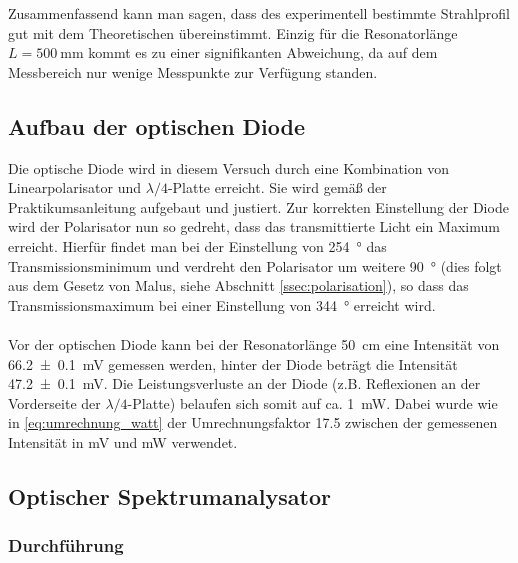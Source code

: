 \documentclass[11pt, a4paper]{article}
\numberwithin{equation}{section}
\begin{document}
Zusammenfassend kann man sagen, dass des experimentell bestimmte Strahlprofil gut mit dem Theoretischen übereinstimmt.
Einzig für die Resonatorlänge $L = \SI{500}{\milli\metre}$ kommt es zu einer signifikanten Abweichung, da auf dem Messbereich nur wenige Messpunkte zur Verfügung standen.


\subsection{Aufbau der optischen Diode}

Die optische Diode wird in diesem Versuch durch eine Kombination von Linearpolarisator und $\lambda/4$-Platte erreicht.
Sie wird gemäß der Praktikumsanleitung aufgebaut und justiert.
Zur korrekten Einstellung der Diode wird der Polarisator nun so gedreht, dass das transmittierte Licht ein Maximum erreicht.
Hierfür findet man bei der Einstellung von \SI{254}{\degree} das Transmissionsminimum und verdreht den Polarisator um weitere \SI{90}{\degree} (dies folgt aus dem Gesetz von Malus, siehe Abschnitt \ref{ssec:polarisation}), so dass das Transmissionsmaximum bei einer Einstellung von \SI{344}{\degree} erreicht wird.\\
\\
Vor der optischen Diode kann bei der Resonatorlänge \SI{50}{\centi\metre} eine Intensität von \SI{66.2+-0.1}{\milli\volt} gemessen werden, hinter der Diode beträgt die Intensität \SI{47.2+-0.1}{\milli\volt}.
Die Leistungsverluste an der Diode (z.B. Reflexionen an der Vorderseite der $\lambda/4$-Platte) belaufen sich somit auf ca. \SI{1}{\milli\watt}.
Dabei wurde wie in \eqref{eq:umrechnung_watt} der Umrechnungsfaktor \num{17.5} zwischen der gemessenen Intensität in \si{\milli\volt} und \si{\milli\watt} verwendet.

\subsection{Optischer Spektrumanalysator}
\label{ssec:spektrumanalysator}

\subsubsection{Durchführung}
\end{document}
